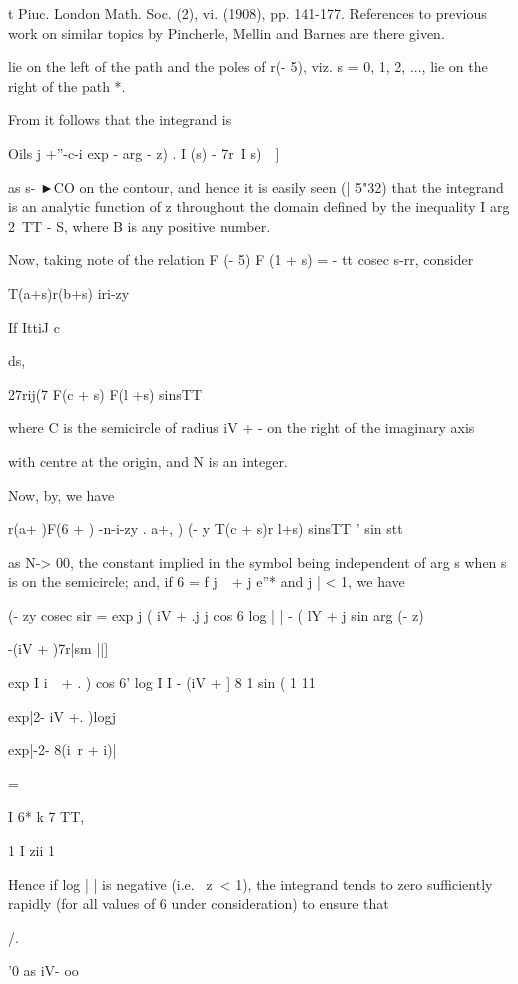 t Piuc. London Math. Soc. (2), vi. (1908), pp. 141-177. References to
previous work on similar topics by Pincherle, Mellin and Barnes are
there given.

%
%

lie on the left of the path and the poles of r(- 5), viz. s = 0, 1, 2,
..., lie on the right of the path *.

From it follows that the integrand is

Oils j +''-c-i exp - arg - z) . I (s) - 7r\ I s)\ \ ]

as s- ►CO on the contour, and hence it is easily seen (| 5"32) that
the integrand is an analytic function of z throughout the domain
defined by the inequality I arg 2\ TT - S, where B is any positive
number.

Now, taking note of the relation F (- 5) F (1 + s) = - tt cosec s-rr,
consider

T(a+s)r(b+s) iri-zy

If IttiJ c

ds,

27rij(7 F(c + s) F(l +s) sinsTT

where C is the semicircle of radius iV + - on the right of the
imaginary axis

with centre at the origin, and N is an integer.

Now, by, we have

r(a+ )F(6 + ) -n-i-zy . a+,\,\,) (- y T(c + s)r l+s) sinsTT ' sin
stt

as N-> 00, the constant implied in the symbol being independent of
arg s when s is on the semicircle; and, if 6 = f j\ \ + j e''* and j
| < 1, we have

(- zy cosec sir = exp j ( iV + .j j cos 6 log | | - ( lY + j sin arg
(- z)

-(iV + )7r|sm ||]

exp I i\ \ + . ) cos 6' log I I - (iV + ] 8 1 sin ( 1 11

exp|2- iV +. )logj

exp|-2- 8(i\ r + i)|

=

  I 6* k 7 TT,

1 I zii 1

Hence if log | | is negative (i.e. \ z\ < 1), the integrand tends to
zero sufficiently rapidly (for all values of 6 under consideration) to
ensure that

/.

'0 as iV- oo

